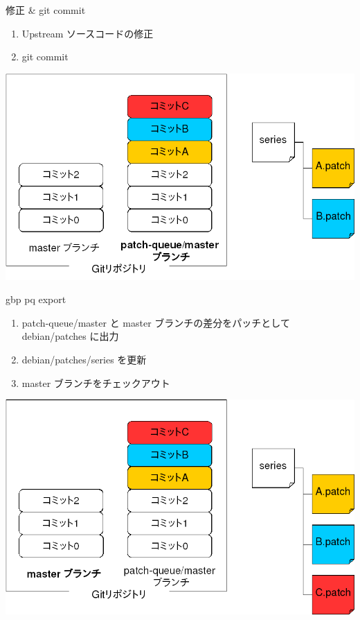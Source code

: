 \begin{frame}{修正 \& git commit}

  \begin{enumerate}
   \item Upstream ソースコードの修正
   \item git commit
  \end{enumerate}

\begin{center}
\includegraphics[width=0.8\hsize]{image201509/gbp-pq2.png}
\end{center}

\end{frame}

\begin{frame}{gbp pq export}
  \begin{enumerate}
   \item patch-queue/master と master ブランチの差分をパッチとして debian/patches に出力
   \item debian/patches/series を更新
   \item master ブランチをチェックアウト
  \end{enumerate}

\begin{center}
\includegraphics[width=0.8\hsize]{image201509/gbp-pq3.png}
\end{center}
  
  
\end{frame}

